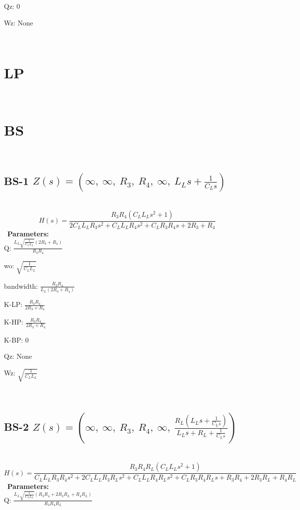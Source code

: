 \documentclass{article}
\begin{document}
Qz: $0$\ 

Wz: $\text{None}$\ 

\ 

\section{LP}\ 
\section{BS}\ 
\subsection{BS-1 $Z(s) = \left( \infty, \  \infty, \  R_{3}, \  R_{4}, \  \infty, \  L_{L} s + \frac{1}{C_{L} s}\right)$ } \ 
\textbf{\[H(s) = \frac{R_{3} R_{4} \left(C_{L} L_{L} s^{2} + 1\right)}{2 C_{L} L_{L} R_{3} s^{2} + C_{L} L_{L} R_{4} s^{2} + C_{L} R_{3} R_{4} s + 2 R_{3} + R_{4}}\] } \ 
\textbf{Parameters:}\\ 

Q: $\frac{L_{L} \sqrt{\frac{1}{C_{L} L_{L}}} \left(2 R_{3} + R_{4}\right)}{R_{3} R_{4}}$\ 

wo: $\sqrt{\frac{1}{C_{L} L_{L}}}$\ 

bandwidth: $\frac{R_{3} R_{4}}{L_{L} \left(2 R_{3} + R_{4}\right)}$\ 

K-LP: $\frac{R_{3} R_{4}}{2 R_{3} + R_{4}}$\ 

K-HP: $\frac{R_{3} R_{4}}{2 R_{3} + R_{4}}$\ 

K-BP: $0$\ 

Qz: $\text{None}$\ 

Wz: $\sqrt{\frac{1}{C_{L} L_{L}}}$\ 

\ 

\subsection{BS-2 $Z(s) = \left( \infty, \  \infty, \  R_{3}, \  R_{4}, \  \infty, \  \frac{R_{L} \left(L_{L} s + \frac{1}{C_{L} s}\right)}{L_{L} s + R_{L} + \frac{1}{C_{L} s}}\right)$ } \ 
\textbf{\[H(s) = \frac{R_{3} R_{4} R_{L} \left(C_{L} L_{L} s^{2} + 1\right)}{C_{L} L_{L} R_{3} R_{4} s^{2} + 2 C_{L} L_{L} R_{3} R_{L} s^{2} + C_{L} L_{L} R_{4} R_{L} s^{2} + C_{L} R_{3} R_{4} R_{L} s + R_{3} R_{4} + 2 R_{3} R_{L} + R_{4} R_{L}}\] } \ 
\textbf{Parameters:}\\ 

Q: $\frac{L_{L} \sqrt{\frac{1}{C_{L} L_{L}}} \left(R_{3} R_{4} + 2 R_{3} R_{L} + R_{4} R_{L}\right)}{R_{3} R_{4} R_{L}}$\ 
\end{document}
